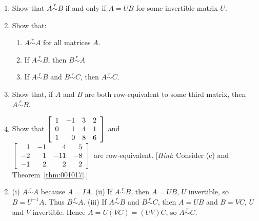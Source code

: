 \begin{multicols}{2}
\begin{ex}
\begin{enumerate}[label={\alph*.}]
\item Show that $A \overset{r}{\sim} B$ if and only if $A = UB$ for some invertible matrix $U$.

\item Show that:

\begin{enumerate}[label={\roman*.}]
\item $A \overset{r}{\sim} A$ for all matrices $A$.

\item If $A \overset{r}{\sim} B$, then $B \overset{r}{\sim} A$


\item If $A \overset{r}{\sim} B$ and $B \overset{r}{\sim} C$, then $A \overset{r}{\sim} C$.

\end{enumerate}
\item Show that, if $A$ and $B$ are both row-equivalent to some third matrix, then $A \overset{r}{\sim} B$.

\item Show that $\left[ \begin{array}{rrrr}
1 & -1 & 3 & 2 \\
0 & 1 & 4 & 1 \\
1 & 0 & 8 & 6
\end{array} \right]$
 and \\ $\left[ \begin{array}{rrrr}
 1 & -1 & 4 & 5 \\
 -2 & 1 & -11 & -8 \\
 -1 & 2 & 2 & 2
 \end{array} \right]$
 are row-equivalent. [\textit{Hint}: Consider (c) and Theorem~\ref{thm:001017}.]

\end{enumerate}
\begin{sol}
\begin{enumerate}[label={\alph*.}]
\setcounter{enumi}{1}
\item (i) $A \overset{r}{\sim} A$ because $A = IA$. (ii) If $A \overset{r}{\sim} B$, then $A = UB$, $U$ invertible, so $B = U^{-1}A$. Thus $B \overset{r}{\sim} A$. (iii) If $A \overset{r}{\sim} B$ and $B \overset{r}{\sim} C$, then $A = UB$ and $B = VC$, $U$ and $V$ invertible. Hence $A = U(VC) = (UV)C$, so $A \overset{r}{\sim} C$.

\end{enumerate}
\end{sol}
\end{ex}


\end{multicols}
